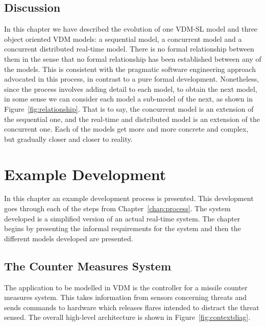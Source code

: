 \documentclass{overturerepchap}
\begin{document}
\section{Discussion}

In this chapter we have described the evolution of one VDM-SL model
and three object oriented VDM models: a sequential model, a concurrent
model and a concurrent distributed real-time model. There is no formal
relationship between them in the sense that no formal relationship has
been established between any of the models. This is consistent with
the pragmatic software engineering approach advocated in this process,
in contrast to a pure formal development. Nonetheless, since the
process involves adding detail to each model, to obtain the next
model, in some sense we can consider each model a sub-model of the
next, as shown in Figure~\ref{fig:relationship}.  That is to say, the
concurrent model is an extension of the sequential one, and the
real-time and distributed model is an extension of the concurrent
one. Each of the models get more and more concrete and complex, but
gradually closer and closer to reality.

\chapter{Example Development}\label{chap:example}

In this chapter an example development process is presented. This
development goes through each of the steps from
Chapter~\ref{chap:process}. The system developed is a simplified
version of an actual real-time system. The chapter begins by
presenting the informal requirements for the system and then the
different models developed are presented.

\section{The Counter Measures System}\label{sec:CMdesc}

The application to be modelled in VDM is the controller for a
missile counter measures system. This takes information from sensors
concerning threats and sends commands to hardware which releases
flares intended to distract the threat sensed.  The overall high-level
architecture is shown in Figure~\ref{fig:contextdiag}.
\end{document}
